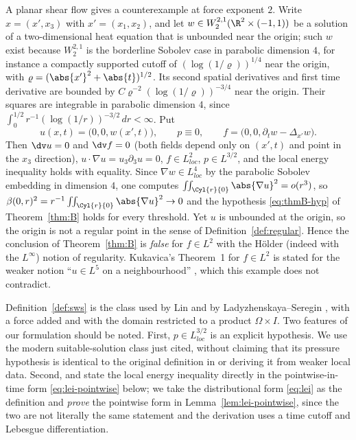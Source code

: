 \documentclass[11pt,reqno]{amsart}
\begin{document}
\begin{remark}\label{rem:shear}
A planar shear flow gives a counterexample at force exponent $2$. Write
$x=(x',x_{3})$ with $x'=(x_{1},x_{2})$, and let
$w\in W^{2,1}_{2}(\R^{2}\times(-1,1))$ be a solution of a two-dimensional heat
equation that is unbounded near the origin; such $w$ exist because
$W^{2,1}_{2}$ is the borderline Sobolev case in parabolic dimension $4$, for
instance a compactly supported cutoff of $(\log(1/\varrho))^{1/4}$ near
the origin, with $\varrho=(\abs{x'}^{2}+\abs{t})^{1/2}$. Its second
spatial derivatives and first time derivative are bounded by
$C\varrho^{-2}(\log(1/\varrho))^{-3/4}$ near the origin. Their squares are
integrable in parabolic dimension $4$, since
$\int_{0}^{1/2} r^{-1}(\log(1/r))^{-3/2}\,dr<\infty$. Put
\[
  u(x,t)=\bigl(0,0,w(x',t)\bigr),\qquad p\equiv0,\qquad
  f=\bigl(0,0,\partial_{t}w-\Delta_{x'}w\bigr).
\]
Then $\dv u=0$ and $\dv f=0$ (both fields depend only on $(x',t)$ and point in
the $x_{3}$ direction), $u\cdot\nabla u=u_{3}\partial_{3}u=0$, $f\in L^{2}_{loc}$,
$p\in L^{3/2}$, and the local energy inequality holds with equality. Since
$\nabla w\in L^{4}_{loc}$ by the parabolic Sobolev embedding in dimension $4$,
one computes $\iint_{\Cyl{r}{0}}\abs{\nabla u}^{2}=o(r^{3})$, so
$\beta(0,r)^{2}=r^{-1}\iint_{\Cyl{r}{0}}\abs{\nabla u}^{2}\to0$ and the
hypothesis \eqref{eq:thmB-hyp} of Theorem~\ref{thm:B} holds for every threshold.
Yet $u$ is unbounded at the origin, so the origin is not a regular point in the
sense of Definition~\ref{def:regular}. Hence the conclusion of
Theorem~\ref{thm:B} is \emph{false} for $f\in L^{2}$ with the H\"older (indeed
with the $L^{\infty}$) notion of regularity. Kukavica's Theorem~1 for
$f\in L^{2}$ is stated for the weaker notion ``$u\in L^{5}$ on a
neighbourhood'' \cite[p.~719]{Kukavica2008}, which this example does not
contradict.
\end{remark}

\begin{remark}\label{rem:definition-sources}
Definition~\ref{def:sws} is the class used by Lin \cite[\S2]{Lin1998} and by
Ladyzhenskaya--Seregin \cite[Definition 2.1]{LadyzhenskayaSeregin1999}, with a
force added and with the domain restricted to a product $\Omega\times I$. Two
features of our formulation should be noted. First, $p\in L^{3/2}_{loc}$
is an explicit hypothesis. We use the modern suitable-solution class just
cited, without claiming that its pressure hypothesis is identical to the
original definition in \cite{CKN1982} or deriving it from weaker local data.
Second, \cite{LadyzhenskayaSeregin1999} and \cite{Kukavica2008} state the
local energy inequality directly in the pointwise-in-time form
\eqref{eq:lei-pointwise} below; we take the distributional form \eqref{eq:lei}
as the definition and \emph{prove} the pointwise form in
Lemma~\ref{lem:lei-pointwise}, since the two are not literally the same
statement and the derivation uses a time cutoff and Lebesgue differentiation.
\end{remark}
\end{document}
